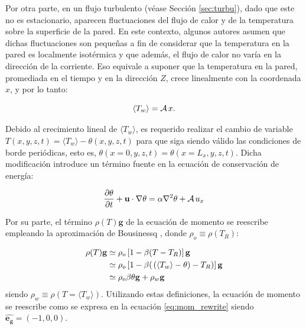 Por otra parte, en un flujo turbulento (véase Sección \ref{sec:turbu}), dado que este no es estacionario, aparecen fluctuaciones del flujo de calor y de la temperatura sobre la superficie de la pared. En este contexto, algunos autores \cite{kasagi1992direct,tao1960} asumen que dichas fluctuaciones son pequeñas a fin de considerar que la temperatura en la pared es localmente isotérmica y que además, el flujo de calor no varía en la dirección de la corriente. Eso equivale a suponer que la temperatura en la pared, promediada en el tiempo y en la dirección $Z$, crece linealmente con la coordenada $x$, y por lo tanto: 

$$
\langle T_w \rangle = \mathcal{A} \hspace{0.5mm} x.
$$

Debido al crecimiento lineal de $\langle T_w \rangle$, es requerido realizar el cambio de variable $T(x,y,z,t) = \langle T_w \rangle - \theta(x,y,z,t)$ para que siga siendo válido las condiciones de borde periódicas, esto es, $\theta(x=0,y,z,t)=\theta(x=L_x,y,z,t)$. Dicha modificación introduce un término fuente en la ecuación de conservación de energía:

\begin{equation}
\frac{ \partial \theta }{ \partial t } + \mathbf{u} \cdot \nabla \theta = \alpha \nabla^2 \theta + \mathcal{A} \hspace{0.5mm} u_x 
\label{eq:energy_pcb_source}
\end{equation}

\newpage
Por su parte, el término $\rho(T) \mathbf{g}$ de la ecuación de momento se reescribe empleando la aproximación de Bousinessq \cite{incropera}, donde $\rho_o \equiv \rho(T_R)$:

\begin{align}
\rho(T) \mathbf{g} &\simeq \rho_o \left[ 1 - \beta (T - T_R) \right] \mathbf{g} \\
				   &\simeq \rho_o \left[ 1 - \beta ( \hspace{0.5mm} (\langle T_w \rangle - \theta) - T_R) \right] \mathbf{g} \\
 		           &\simeq \rho_o \beta \theta \mathbf{g} + \rho_w \mathbf{g}
\label{eq:bussinesq}
\end{align}
siendo $\rho_w \equiv \rho(T=\langle T_w \rangle)$. Utilizando estas definiciones, la ecuación de momento se reescribe como se expresa en la ecuación \ref{eq:mom_rewrite} siendo $\mathbf{\hat{e_g}}=(-1,0,0)$.

